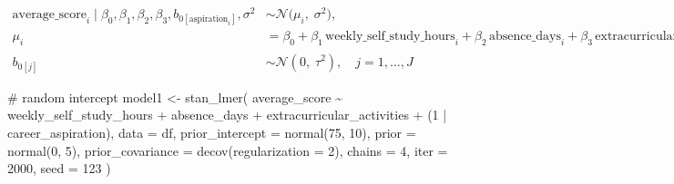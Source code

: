 \documentclass[
  letterpaper,
  DIV=11,
  numbers=noendperiod]{scrartcl}
\newenvironment{Shaded}{\begin{snugshade}}{\end{snugshade}}
\newcommand{\AttributeTok}[1]{\textcolor[rgb]{0.40,0.45,0.13}{#1}}
\newcommand{\CommentTok}[1]{\textcolor[rgb]{0.37,0.37,0.37}{#1}}
\newcommand{\DecValTok}[1]{\textcolor[rgb]{0.68,0.00,0.00}{#1}}
\newcommand{\FunctionTok}[1]{\textcolor[rgb]{0.28,0.35,0.67}{#1}}
\newcommand{\NormalTok}[1]{\textcolor[rgb]{0.00,0.23,0.31}{#1}}
\newcommand{\OtherTok}[1]{\textcolor[rgb]{0.00,0.23,0.31}{#1}}
\newcommand{\SpecialCharTok}[1]{\textcolor[rgb]{0.37,0.37,0.37}{#1}}
\begin{document}
\[
\begin{aligned}
\text{average_score}_i \;|\;\beta_0, \beta_1, \beta_2, \beta_3, b_{0[\text{aspiration}_i]}, \sigma^2
&\sim \mathcal{N}\bigl(\mu_i,\;\sigma^2\bigr), \\[4pt]
\mu_i &= \beta_0
         + \beta_1\,\text{weekly_self_study_hours}_i
         + \beta_2\,\text{absence_days}_i
         + \beta_3\,\text{extracurricular_activities}_i
         + b_{0[\text{aspiration}_i]}, \\[4pt]
b_{0[j]} &\sim \mathcal{N}(0,\;\tau^2), 
\quad j = 1,\dots,J
\end{aligned}
\]

\begin{Shaded}
\begin{Highlighting}[]
\CommentTok{\# random intercept}
\NormalTok{model1 }\OtherTok{\textless{}{-}} \FunctionTok{stan\_lmer}\NormalTok{(}
\NormalTok{  average\_score }\SpecialCharTok{\textasciitilde{}}\NormalTok{ weekly\_self\_study\_hours }
                \SpecialCharTok{+}\NormalTok{ absence\_days }
                \SpecialCharTok{+}\NormalTok{ extracurricular\_activities }
                \SpecialCharTok{+}\NormalTok{ (}\DecValTok{1} \SpecialCharTok{|}\NormalTok{ career\_aspiration),}
  \AttributeTok{data =}\NormalTok{ df,}
  \AttributeTok{prior\_intercept    =} \FunctionTok{normal}\NormalTok{(}\DecValTok{75}\NormalTok{, }\DecValTok{10}\NormalTok{),}
  \AttributeTok{prior              =} \FunctionTok{normal}\NormalTok{(}\DecValTok{0}\NormalTok{, }\DecValTok{5}\NormalTok{),}
  \AttributeTok{prior\_covariance   =} \FunctionTok{decov}\NormalTok{(}\AttributeTok{regularization =} \DecValTok{2}\NormalTok{),}
  \AttributeTok{chains =} \DecValTok{4}\NormalTok{, }\AttributeTok{iter =} \DecValTok{2000}\NormalTok{, }\AttributeTok{seed =} \DecValTok{123}
\NormalTok{)}
\end{Highlighting}
\end{Shaded}
\end{document}
